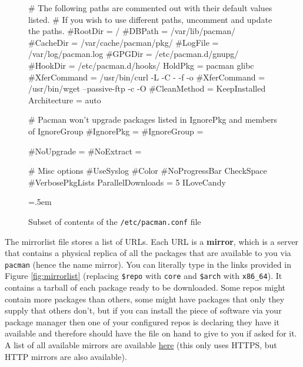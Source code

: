 \documentclass{article}
\theoremstyle{definition}
\newenvironment{cverbatim}
    {\SaveVerbatim{cverb}}
    {\endSaveVerbatim
    \flushleft\fboxrule=0pt\fboxsep=.5em
    \colorbox{cverbbg}{%
      \makebox[\dimexpr\linewidth-2\fboxsep][l]{\BUseVerbatim{cverb}}%
    }
    \endflushleft
  }
\begin{document}
    \begin{figure}
      \begin{cverbatim} 
        # The following paths are commented out with their default values listed.
        # If you wish to use different paths, uncomment and update the paths.
        #RootDir     = /
        #DBPath      = /var/lib/pacman/
        #CacheDir    = /var/cache/pacman/pkg/
        #LogFile     = /var/log/pacman.log
        #GPGDir      = /etc/pacman.d/gnupg/
        #HookDir     = /etc/pacman.d/hooks/
        HoldPkg     = pacman glibc
        #XferCommand = /usr/bin/curl -L -C - -f -o %
        #XferCommand = /usr/bin/wget --passive-ftp -c -O %
        #CleanMethod = KeepInstalled
        Architecture = auto

        # Pacman won't upgrade packages listed in IgnorePkg and members of IgnoreGroup
        #IgnorePkg   =
        #IgnoreGroup =

        #NoUpgrade   =
        #NoExtract   =

        # Misc options
        #UseSyslog
        #Color
        #NoProgressBar
        CheckSpace
        #VerbosePkgLists
        ParallelDownloads = 5
        ILoveCandy

      \end{cverbatim}
      \caption{Subset of contents of the \texttt{/etc/pacman.conf} file} \label{fig:pacman.conf}
    \end{figure}
    
    The mirrorlist file stores a list of URLs. Each URL is a \textbf{mirror}, which is a server that contains a physical replica of all the packages that are available to you via \texttt{pacman} (hence the name mirror). You can literally type in the links provided in Figure \ref{fig:mirrorlist} (replacing \texttt{\$repo} with \texttt{core} and \texttt{\$arch} with \texttt{x86\_64}). It contains a tarball of each package ready to be downloaded. Some repos might contain more packages than others, some might have packages that only they supply that others don’t, but if you can install the piece of software via your package manager then one of your configured repos is declaring they have it available and therefore should have the file on hand to give to you if asked for it. A list of all available mirrors are available \href{https://archlinux.org/mirrorlist/all/https/}{here} (this only uses HTTPS, but HTTP mirrors are also available).  
\end{document}
